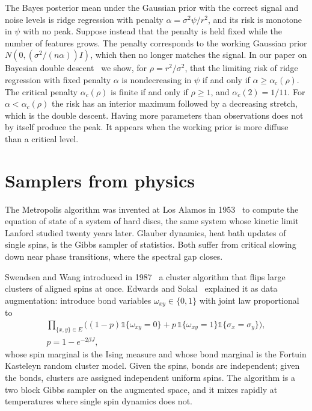 The Bayes posterior mean under the Gaussian prior with the correct signal and noise levels is ridge regression with penalty $\alpha = \sigma^2\psi/r^2$, and its risk is monotone in $\psi$ with no peak. Suppose instead that the penalty is held fixed while the number of features grows. The penalty corresponds to the working Gaussian prior $N(0,(\sigma^2/(n\alpha))I)$, which then no longer matches the signal. In our paper on Bayesian double descent~\cite{polsonsokolov2025dd} we show, for $\rho = r^2/\sigma^2$, that the limiting risk of ridge regression with fixed penalty $\alpha$ is nondecreasing in $\psi$ if and only if $\alpha\geq\alpha_c(\rho)$. The critical penalty $\alpha_c(\rho)$ is finite if and only if $\rho\geq1$, and $\alpha_c(2) = 1/11$. For $\alpha<\alpha_c(\rho)$ the risk has an interior maximum followed by a decreasing stretch, which is the double descent. Having more parameters than observations does not by itself produce the peak. It appears when the working prior is more diffuse than a critical level.

\section{Samplers from physics}

The Metropolis algorithm was invented at Los Alamos in 1953~\cite{metropolis1953} to compute the equation of state of a system of hard discs, the same system whose kinetic limit Lanford studied twenty years later. Glauber dynamics, heat bath updates of single spins, is the Gibbs sampler of statistics. Both suffer from critical slowing down near phase transitions, where the spectral gap closes.

Swendsen and Wang introduced in 1987~\cite{swendsen1987} a cluster algorithm that flips large clusters of aligned spins at once. Edwards and Sokal~\cite{edwards1988} explained it as data augmentation: introduce bond variables $\omega_{xy}\in\{0,1\}$ with joint law proportional to
\begin{gather*}
\prod_{\{x,y\}\in E}\Big((1-p)\mathbb{1}\{\omega_{xy} = 0\}+p\,\mathbb{1}\{\omega_{xy} = 1\}\mathbb{1}\{\sigma_x = \sigma_y\}\Big), \\
p = 1-e^{-2\beta J},
\end{gather*}
whose spin marginal is the Ising measure and whose bond marginal is the Fortuin Kasteleyn random cluster model. Given the spins, bonds are independent; given the bonds, clusters are assigned independent uniform spins. The algorithm is a two block Gibbs sampler on the augmented space, and it mixes rapidly at temperatures where single spin dynamics does not.

